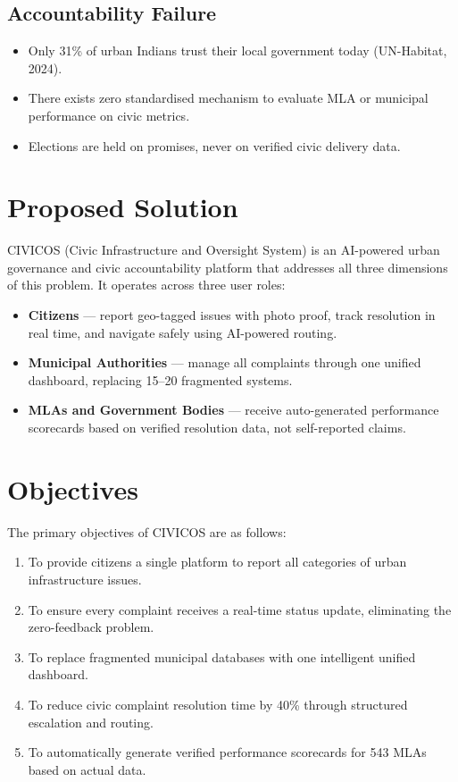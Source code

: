 \documentclass[12pt,a4paper]{report}
\begin{document}
\subsection{Accountability Failure}

\begin{itemize}
    \item Only 31\% of urban Indians trust their local government today
    (UN-Habitat, 2024).
    \item There exists zero standardised mechanism to evaluate MLA or municipal
    performance on civic metrics.
    \item Elections are held on promises, never on verified civic delivery data.
\end{itemize}

\section{Proposed Solution}

CIVICOS (Civic Infrastructure and Oversight System) is an AI-powered urban
governance and civic accountability platform that addresses all three dimensions
of this problem. It operates across three user roles:

\begin{itemize}
    \item \textbf{Citizens} --- report geo-tagged issues with photo proof, track
    resolution in real time, and navigate safely using AI-powered routing.
    \item \textbf{Municipal Authorities} --- manage all complaints through one
    unified dashboard, replacing 15--20 fragmented systems.
    \item \textbf{MLAs and Government Bodies} --- receive auto-generated
    performance scorecards based on verified resolution data, not self-reported
    claims.
\end{itemize}

\section{Objectives}

The primary objectives of CIVICOS are as follows:

\begin{enumerate}
    \item To provide citizens a single platform to report all categories of
    urban infrastructure issues.
    \item To ensure every complaint receives a real-time status update,
    eliminating the zero-feedback problem.
    \item To replace fragmented municipal databases with one intelligent unified
    dashboard.
    \item To reduce civic complaint resolution time by 40\% through structured
    escalation and routing.
    \item To automatically generate verified performance scorecards for 543 MLAs
    based on actual data.
\end{enumerate}
\end{document}
